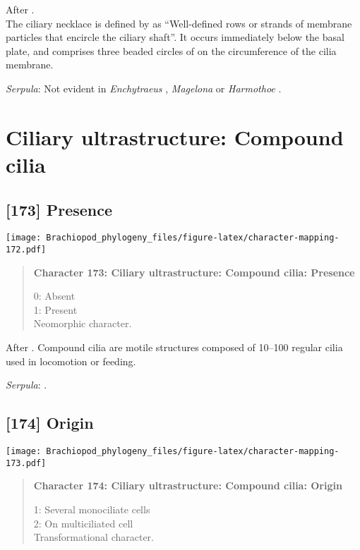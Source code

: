 \documentclass[openany]{book}
\theoremstyle{definition}
\theoremstyle{definition}
\theoremstyle{definition}
\theoremstyle{remark}
\begin{document}
After \citet{Lundin2009}.\\
The ciliary necklace is defined by \citet{Gilula1972} as ``Well-defined
rows or strands of membrane particles that encircle the ciliary shaft''.
It occurs immediately below the basal plate, and comprises three beaded
circles of on the circumference of the cilia membrane.

\hypertarget{Serpula-coding-172}{}
\emph{Serpula}: Not evident in \emph{Enchytraeus} \citep{Reger1967},
\emph{Magelona} \citep{Bartolomaeus1995} or \emph{Harmothoe}
\citep{Holborow1969}.

\section{Ciliary ultrastructure: Compound
cilia}\label{ciliary-ultrastructure-compound-cilia}

\subsection*{{[}173{]} Presence}\label{presence-3}

\texttt{[image: Brachiopod\_phylogeny\_files/figure-latex/character-mapping-172.pdf]}

\begin{quote}
\textbf{Character 173: Ciliary ultrastructure: Compound cilia: Presence}

0: Absent\\
1: Present\\
Neomorphic character.
\end{quote}

After \citet{Lundin2009}. Compound cilia are motile structures composed
of 10--100 regular cilia used in locomotion or feeding.

\hypertarget{Serpula-coding-173}{}
\emph{Serpula}: \citet{Nielsen1987}.

\subsection*{{[}174{]} Origin}\label{origin-1}

\texttt{[image: Brachiopod\_phylogeny\_files/figure-latex/character-mapping-173.pdf]}

\begin{quote}
\textbf{Character 174: Ciliary ultrastructure: Compound cilia: Origin}

1: Several monociliate cells\\
2: On multiciliated cell\\
Transformational character.
\end{quote}
\end{document}
